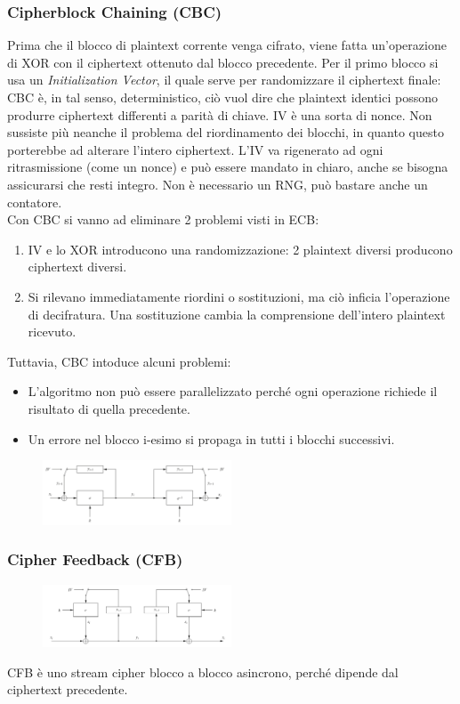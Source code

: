 \documentclass[a4paper,12pt]{article}
\begin{document}
\subsubsection{Cipherblock Chaining (CBC)}
Prima che il blocco di plaintext corrente venga cifrato, viene fatta un'operazione di XOR con il ciphertext ottenuto dal blocco precedente.
Per il primo blocco si usa un \textit{Initialization Vector}, il quale serve per randomizzare il ciphertext finale: CBC è, in tal senso, deterministico, ciò vuol dire che plaintext identici possono produrre ciphertext differenti a parità di chiave.
IV è una sorta di nonce. Non sussiste più neanche il problema del riordinamento dei blocchi, in quanto questo porterebbe ad alterare l'intero ciphertext. L'IV va rigenerato ad ogni ritrasmissione (come un nonce) e può essere mandato in chiaro, anche se bisogna assicurarsi che resti integro.
Non è necessario un RNG, può bastare anche un contatore. \\
Con CBC si vanno ad eliminare 2 problemi visti in ECB:
\begin{enumerate}
	\item IV e lo XOR introducono una randomizzazione: 2 plaintext diversi producono ciphertext diversi.
	\item Si rilevano immediatamente riordini o sostituzioni, ma ciò inficia l'operazione di decifratura. Una sostituzione cambia la comprensione dell'intero plaintext ricevuto.
\end{enumerate}
Tuttavia, CBC intoduce alcuni problemi:
\begin{itemize}
	\item L'algoritmo non può essere parallelizzato perché ogni operazione richiede il risultato di quella precedente.
	\item Un errore nel blocco i-esimo si propaga in tutti i blocchi successivi.
\end{itemize} 
\begin{figure}[H]
  \centering
  \includegraphics[width=0.5\textwidth]{img/cbc}
\end{figure}

\subsubsection{Cipher Feedback (CFB)}
\begin{figure}[H]
  \centering
  \includegraphics[width=0.5\textwidth]{img/cfb}
\end{figure}
CFB è uno stream cipher blocco a blocco asincrono, perché dipende dal ciphertext precedente.
\end{document}
